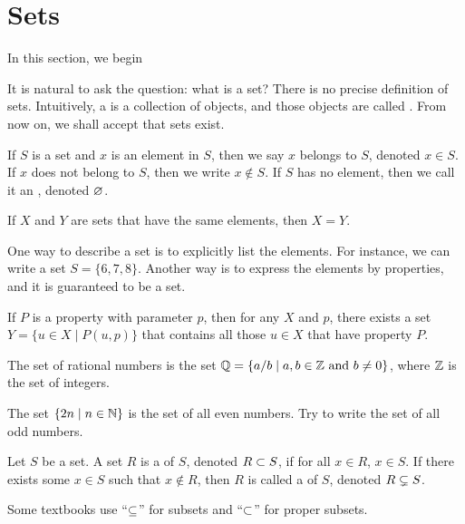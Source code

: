 \documentclass[10pt]{article}
\begin{document}
\section{Sets}
\par
In this section, we begin



It is natural to ask the question: what is a set? There is no precise definition of sets. Intuitively, a  is a collection of objects, and those objects are called . From now on, we shall accept that sets exist.
\par
If $S$ is a set and $x$ is an element in $S$, then we say $x$ belongs to $S$, denoted $x\in S$. If $x$ does not belong to $S$, then we write $x\notin S$. If $S$ has no element, then we call it an , denoted $\varnothing$.
\begin{Axiom of Extensionality}
    If $X$ and $Y$ are sets that have the same elements, then $X=Y$.
\end{Axiom of Extensionality}
\par
One way to describe a set is to explicitly list the elements. For instance, we can write a set $S=\{6,7,8\}$. Another way is to express the elements by properties, and it is guaranteed to be a set. 
\begin{Axiom Schema of Separation}
    If $P$ is a property with parameter $p$, then for any $X$ and $p$, there exists a set $Y=\{u\in X\mid P(u,p)\}$ that contains all those $u\in X$ that have property $P$.
\end{Axiom Schema of Separation}
\begin{example}
    The set of rational numbers is the set $\mathbb{Q}=\{a/b\mid a,b\in\mathbb{Z}\ \text{and}\ b\ne 0\}$, where $\mathbb{Z}$ is the set of integers.
\end{example}
\begin{example}
    The set $\{2n\mid n\in\mathbb{N}\}$ is the set of all even numbers. Try to write the set of all odd numbers.
\end{example}
\begin{definition}
    Let $S$ be a set. A set $R$ is a  of $S$, denoted $R\subset S$, if for all $x\in R$, $x\in S$. If there exists some $x\in S$ such that $x\notin R$, then $R$ is called a  of $S$, denoted $R\subsetneq S$.
\end{definition}
\begin{remark}
    Some textbooks use ``$\subseteq$'' for subsets and ``$\subset$'' for proper subsets.
\end{remark}
\end{document}
